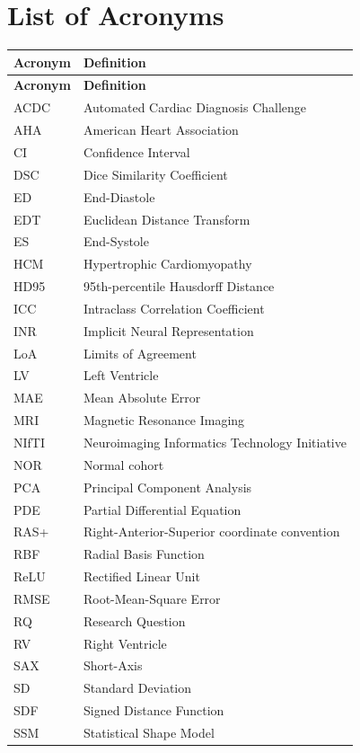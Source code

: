 \chapter*{List of Acronyms}

\begingroup
\thesistablestyle
\begin{longtable}{@{}p{}p{}@{}}
\toprule
\textbf{Acronym} & \textbf{Definition} \\
\midrule
\endfirsthead
\toprule
\textbf{Acronym} & \textbf{Definition} \\
\midrule
\endhead
ACDC & Automated Cardiac Diagnosis Challenge \\
AHA & American Heart Association \\
CI & Confidence Interval \\
DSC & Dice Similarity Coefficient \\
ED & End-Diastole \\
EDT & Euclidean Distance Transform \\
ES & End-Systole \\
HCM & Hypertrophic Cardiomyopathy \\
HD95 & 95th-percentile Hausdorff Distance \\
ICC & Intraclass Correlation Coefficient \\
INR & Implicit Neural Representation \\
LoA & Limits of Agreement \\
LV & Left Ventricle \\
MAE & Mean Absolute Error \\
MRI & Magnetic Resonance Imaging \\
NIfTI & Neuroimaging Informatics Technology Initiative \\
NOR & Normal cohort \\
PCA & Principal Component Analysis \\
PDE & Partial Differential Equation \\
RAS+ & Right-Anterior-Superior coordinate convention \\
RBF & Radial Basis Function \\
ReLU & Rectified Linear Unit \\
RMSE & Root-Mean-Square Error \\
RQ & Research Question \\
RV & Right Ventricle \\
SAX & Short-Axis \\
SD & Standard Deviation \\
SDF & Signed Distance Function \\
SSM & Statistical Shape Model \\
\bottomrule
\end{longtable}
\endgroup